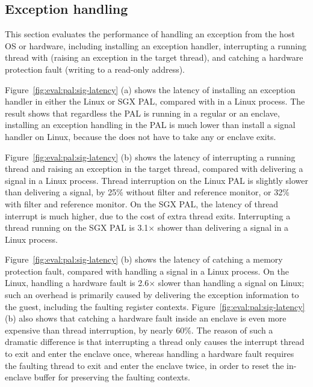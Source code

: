 \subsection{Exception handling}


This section evaluates the performance of handling an exception from the host OS or hardware,
including installing an exception handler,
interrupting a running thread
with  (raising an  exception in the target thread),
and catching a hardware protection fault
(writing to a read-only address).






Figure~\ref{fig:eval:pal:sig-latency} (a)
shows the latency of installing an exception handler in either the Linux or SGX PAL, compared with
 in a Linux process.
The result
shows that regardless the PAL is running in a regular \picoproc{} or an enclave,
installing an exception handling
in the PAL
is much lower than install a signal handler
on Linux,
because the \hostapi{} does not have to take any \linuxapi{} or enclave exits.


Figure~\ref{fig:eval:pal:sig-latency} (b)
shows the latency of interrupting a running thread
and raising an exception
in the target thread, compared with delivering a  signal in a Linux process.
Thread interruption on the Linux PAL
is slightly slower than
delivering a  signal,
by \roughly{}25\% without \seccomp{} filter and reference monitor, or \roughly{}32\% with \seccomp{} filter and reference monitor.
On the SGX PAL,
the latency of thread interrupt
is much higher, due to the cost of extra thread exits.
Interrupting a thread running on the SGX PAL
is \roughly{}3.1$\times$ shower than delivering a  signal in a Linux process.



Figure~\ref{fig:eval:pal:sig-latency} (b)
shows the latency of catching a memory protection fault,
compared with handling
a  signal in a Linux process.
On the Linux, handling a hardware fault is \roughly{}2.6$\times$ slower than handling a  signal on Linux;
such an overhead
is primarily caused by delivering
the exception information to the guest, including the faulting register contexts.
Figure~\ref{fig:eval:pal:sig-latency} (b)
also shows that catching a hardware fault inside an enclave
is even more expensive
than thread interruption, by nearly 60\%.
The reason of such a dramatic difference is that
interrupting a thread only causes the interrupt thread to exit and enter the enclave once,
whereas handling a hardware fault
requires the faulting thread to exit and enter the enclave twice,
in order to reset the in-enclave buffer
for preserving the faulting contexts.


